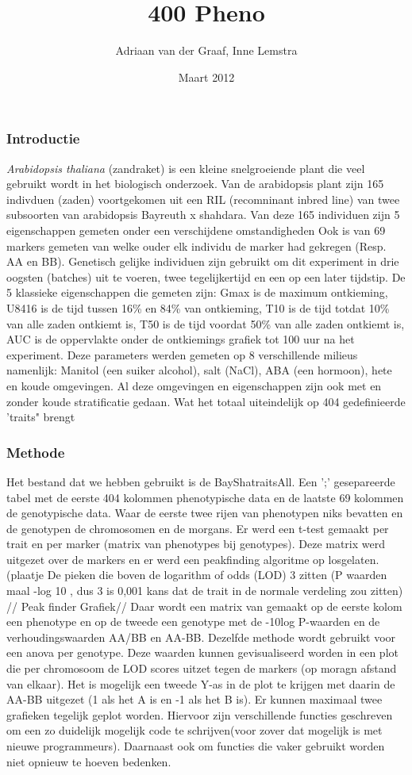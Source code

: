 \documentclass[12pt,a4paper, twocolumn]{article}
\author{Adriaan van der Graaf, Inne Lemstra}
\title{400 Pheno}
\date{Maart 2012}
\begin{document}
\maketitle


\subsubsection*{Introductie}
\textit{Arabidopsis thaliana} (zandraket) is een kleine snelgroeiende plant die veel gebruikt wordt in het biologisch onderzoek.
Van de arabidopsis plant zijn 165 indivduen (zaden) voortgekomen uit een RIL (recomninant inbred line) van twee subsoorten van arabidopsis Bayreuth x shahdara.
Van deze 165 individuen zijn 5 eigenschappen gemeten onder een verschijdene omstandigheden
Ook is van 69 markers  gemeten van welke ouder elk individu de marker had gekregen (Resp. AA en BB).
Genetisch gelijke individuen zijn gebruikt om dit experiment in drie oogsten (batches) uit te voeren, twee tegelijkertijd en een op een later tijdstip.
De 5 klassieke eigenschappen die gemeten zijn:
Gmax is de maximum ontkieming,
U8416 is de tijd tussen 16\% en 84\% van  ontkieming,
T10 is de tijd totdat 10\% van alle zaden ontkiemt is,
T50 is de tijd voordat 50\% van alle zaden ontkiemt is,
AUC is de oppervlakte onder de ontkiemings grafiek  tot 100 uur na het experiment.
Deze parameters werden gemeten op 8 verschillende milieus namenlijk:
Manitol (een suiker alcohol), salt (NaCl), ABA (een hormoon), hete en koude omgevingen.
Al deze omgevingen en eigenschappen zijn ook met en zonder koude stratificatie gedaan. 
Wat het totaal uiteindelijk op 404 gedefinieerde 'traits" brengt\\
\subsubsection*{Methode}
Het bestand dat we hebben gebruikt is de BayShatraitsAll. 
Een ';' gesepareerde tabel met de eerste 404 kolommen phenotypische data en de laatste 69 kolommen de genotypische data.
Waar de eerste twee rijen van phenotypen niks bevatten en de genotypen de chromosomen en de morgans.
Er werd een t-test gemaakt per trait en per marker (matrix van phenotypes bij genotypes).
Deze matrix werd uitgezet over de markers en er werd een peakfinding algoritme op losgelaten. (plaatje
De pieken die boven de logarithm of odds (LOD) 3 zitten (P waarden maal -log 10 , dus 3 is 0,001 kans dat de trait in de normale verdeling zou zitten) //
Peak finder Grafiek//
Daar wordt een matrix van gemaakt op de eerste kolom een phenotype en op de tweede een genotype met de -10log P-waarden en de  verhoudingswaarden AA/BB en AA-BB.
Dezelfde methode wordt gebruikt voor een anova per genotype. 
Deze waarden kunnen gevisualiseerd worden in een plot die per chromosoom de LOD scores uitzet tegen de markers (op moragn afstand van elkaar).
Het is mogelijk een tweede Y-as in de plot te krijgen met daarin de AA-BB uitgezet (1 als het A is en -1 als het B is).
Er kunnen maximaal twee grafieken tegelijk geplot worden.
Hiervoor zijn verschillende functies geschreven om een zo duidelijk mogelijk code te schrijven(voor zover dat mogelijk is met nieuwe programmeurs).
Daarnaast ook om functies die vaker gebruikt worden niet opnieuw te hoeven bedenken.
\end{document}
